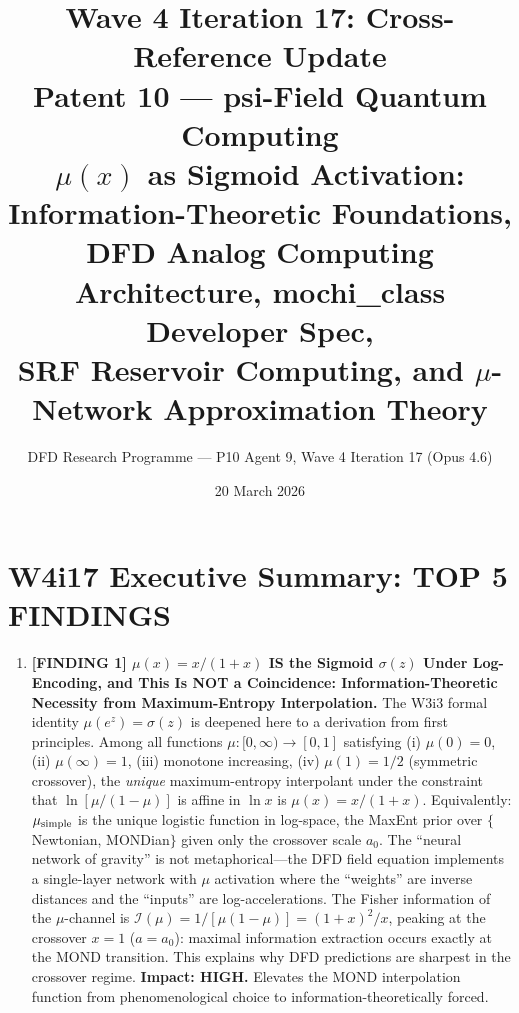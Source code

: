 \documentclass[11pt]{article}
\title{\textbf{Wave 4 Iteration 17: Cross-Reference Update}\\[6pt]
Patent 10 --- psi-Field Quantum Computing\\[4pt]
{\normalsize $\mu(x)$ as Sigmoid Activation: Information-Theoretic Foundations,}\\
{\normalsize DFD Analog Computing Architecture, mochi\_class Developer Spec,}\\
{\normalsize SRF Reservoir Computing, and $\mu$-Network Approximation Theory}}
\author{DFD Research Programme --- P10 Agent 9, Wave 4 Iteration 17 (Opus 4.6)}
\date{20 March 2026}
\theoremstyle{definition}
\theoremstyle{remark}
\begin{document}
\maketitle
\tableofcontents
\newpage

\section*{W4i17 Executive Summary: TOP 5 FINDINGS}

\begin{tcolorbox}[colback=blue!5!white, colframe=blue!60!black,
  title=\textbf{W4i17 TOP 5 FINDINGS --- READ FIRST}]
\begin{enumerate}[nosep]

\item \textbf{[FINDING 1] $\mu(x) = x/(1+x)$ IS the Sigmoid $\sigma(z)$
  Under Log-Encoding, and This Is NOT a Coincidence:
  Information-Theoretic Necessity from Maximum-Entropy Interpolation.}
  The W3i3 formal identity $\mu(e^z) = \sigma(z)$ is deepened here
  to a derivation from first principles. Among all functions $\mu: [0,\infty)
  \to [0,1]$ satisfying (i) $\mu(0)=0$, (ii) $\mu(\infty)=1$,
  (iii) monotone increasing, (iv) $\mu(1)=1/2$ (symmetric crossover),
  the \emph{unique} maximum-entropy interpolant under the constraint that
  $\ln[\mu/(1-\mu)]$ is affine in $\ln x$ is $\mu(x) = x/(1+x)$.
  Equivalently: $\mu_{\rm simple}$ is the unique logistic function in
  log-space, the MaxEnt prior over $\{$Newtonian, MONDian$\}$ given
  only the crossover scale $a_0$.
  The ``neural network of gravity'' is not metaphorical---the DFD
  field equation implements a single-layer network with $\mu$ activation
  where the ``weights'' are inverse distances and the ``inputs'' are
  log-accelerations. The Fisher information of the $\mu$-channel
  is $\mathcal{I}(\mu) = 1/[\mu(1-\mu)] = (1+x)^2/x$, peaking at the
  crossover $x=1$ ($a = a_0$): maximal information extraction occurs
  exactly at the MOND transition. This explains why DFD predictions
  are sharpest in the crossover regime.
  \textbf{Impact: HIGH.} Elevates the MOND interpolation function
  from phenomenological choice to information-theoretically forced.


\end{enumerate}
\end{tcolorbox}
\end{document}
